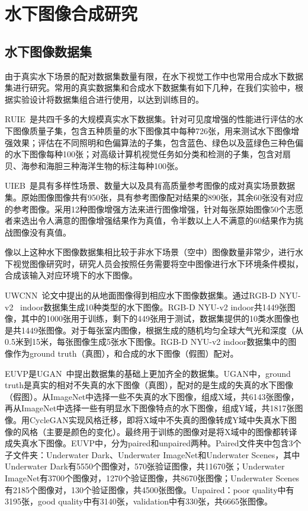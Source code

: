 \section{水下图像合成研究}
\subsection{水下图像数据集}
由于真实水下场景的配对数据集数量有限，在水下视觉工作中也常用合成水下数据集进行研究。常用的真实数据集和合成水下数据集有如下几种，在我们实验中，根据实验设计将数据集组合进行使用，以达到训练目的。

RUIE~\cite{liu2019real}是共四千多的大规模真实水下数据集。针对可见度增强的性能进行评估的水下图像质量子集，包含五种质量的水下图像其中每种726张，用来测试水下图像增强效果；评估在不同照明和色偏算法的子集，包含蓝色、绿色以及蓝绿色三种色偏的水下图像每种100张；对高级计算机视觉任务如分类和检测的子集，包含对扇贝、海参和海胆三种海洋生物的标注每种100张。

UIEB~\cite{li2019underwater}是具有多样性场景、数量大以及具有高质量参考图像的成对真实场景数据集。原始图像图像共有950张，具有参考图像配对结果的890张，其余60张没有对应的参考图像。采用12种图像增强方法来进行图像增强，针对每张原始图像50个志愿者来选出令人满意的图像增强结果作为真值，令半数以上人不满意的60结果作为挑战图像没有真值。

像以上这种水下图像数据集相比较于非水下场景（空中）图像数量非常少，进行水下视觉图像研究时，研究人员会按照任务需要将空中图像进行水下环境条件模拟，合成该输入对应环境下的水下图像。

UWCNN~\cite{li2020underwater}论文中提出的从地面图像得到相应水下图像数据集。通过RGB-D NYU-v2~\cite{Silberman:ECCV12} indoor数据集生成10种类型的水下图像。RGB-D NYU-v2 indoor共1449张图像，其中的1000张用于训练，剩下的449张用于测试，数据集提供的10类水图像也是共1449张图像。对于每张室内图像，根据生成的随机均匀全球大气光和深度（从0.5米到15米，每张图像生成5张水下图像。RGB-D NYU-v2 indoor数据集中的图像作为ground truth（真图），和合成的水下图像（假图）配对。

EUVP是UGAN~\cite{fabbri2018enhancing}中提出数据集的基础上更加齐全的数据集。UGAN中，ground truth是真实的相对不失真的水下图像（真图），配对的是生成的失真的水下图像（假图）。从ImageNet中选择一些不失真的水下图像，组成X域，共6143张图像，再从ImageNet中选择一些有明显水下图像特点的水下图像，组成Y域，共1817张图像。用CycleGAN实现风格迁移，即将X域中不失真的图像转成Y域中失真水下图像的风格（主要是颜色的变化）。最终用于训练的图像对是将X域中的图像都转译成失真水下图像。EUVP中，分为paired和unpaired两种。Paired文件夹中包含3个子文件夹：Underwater Dark、Underwater ImageNet和Underwater Scenes，其中Underwater Dark有5550个图像对，570张验证图像，共11670张；Underwater ImageNet有3700个图像对，1270个验证图像，共8670张图像；Underwater Scenes有2185个图像对，130个验证图像，共4500张图像。Unpaired：poor quality中有3195张，good quality中有3140张，validation中有330张，共6665张图像。

